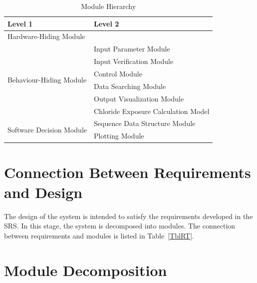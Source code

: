 \documentclass[12pt, titlepage]{article}
\begin{document}
\begin{table}[h!]
\centering
\begin{tabular}{p{} p{}}
\toprule
\textbf{Level 1} & \textbf{Level 2}\\
\midrule

{Hardware-Hiding Module} & ~ \\
\midrule

\multirow{6}{0.3\textwidth}{Behaviour-Hiding Module} & Input Parameter Module\\
& Input Verification Module\\
& Control Module\\
& Data Searching Module\\
& Output Visualization Module\\
& Chloride Exposure Calculation Model \\
\midrule

\multirow{2}{0.3\textwidth}{Software Decision Module} & Sequence Data Structure Module \\
& Plotting Module \\
\bottomrule

\end{tabular}
\caption{Module Hierarchy}
\label{TblMH}
\end{table}

\section{Connection Between Requirements and Design} \label{SecConnection}

The design of the system is intended to satisfy the requirements developed in
the SRS. In this stage, the system is decomposed into modules. The connection
between requirements and modules is listed in Table~\ref{TblRT}. 


\section{Module Decomposition} \label{SecMD}
\end{document}
